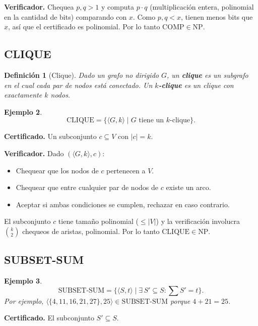\documentclass[11pt,a4paper]{article}
\theoremstyle{definicion}
\newtheorem{definicion}{Definición}[section]
\newtheorem{ejemplo}[definicion]{Ejemplo}
\newcommand{\enc}[1]{\langle #1 \rangle}
\newcommand{\NP}{\mathrm{NP}}
\begin{document}
\textbf{Verificador.} Chequea $p, q > 1$ y computa $p \cdot q$ (multiplicación entera, polinomial en la cantidad de bits) comparando con $x$. Como $p, q < x$, tienen menos bits que $x$, así que el certificado es polinomial. Por lo tanto $\mathrm{COMP} \in \NP$.

\subsection{CLIQUE}

\begin{definicion}[Clique]
Dado un grafo no dirigido $G$, un \textbf{clique} es un subgrafo en el cual cada par de nodos está conectado. Un \textbf{$k$-clique} es un clique con exactamente $k$ nodos.
\end{definicion}

\begin{ejemplo}
\[
\mathrm{CLIQUE} = \{ \enc{G, k} \mid G \text{ tiene un } k\text{-clique}\}.
\]
\end{ejemplo}

\textbf{Certificado.} Un subconjunto $c \subseteq V$ con $|c| = k$.

\textbf{Verificador.} Dado $(\enc{G, k}, c)$:
\begin{itemize}
    \item Chequear que los nodos de $c$ pertenecen a $V$.
    \item Chequear que entre cualquier par de nodos de $c$ existe un arco.
    \item Aceptar si ambas condiciones se cumplen, rechazar en caso contrario.
\end{itemize}

El subconjunto $c$ tiene tamaño polinomial ($\leq |V|$) y la verificación involucra $\binom{k}{2}$ chequeos de aristas, polinomial. Por lo tanto $\mathrm{CLIQUE} \in \NP$.

\subsection{SUBSET-SUM}

\begin{ejemplo}
\[
\mathrm{SUBSET\text{-}SUM} = \{ \enc{S, t} \mid \exists\, S' \subseteq S : \textstyle\sum S' = t\}.
\]
Por ejemplo, $\enc{\{4, 11, 16, 21, 27\}, 25} \in \mathrm{SUBSET\text{-}SUM}$ porque $4 + 21 = 25$.
\end{ejemplo}

\textbf{Certificado.} El subconjunto $S' \subseteq S$.
\end{document}
